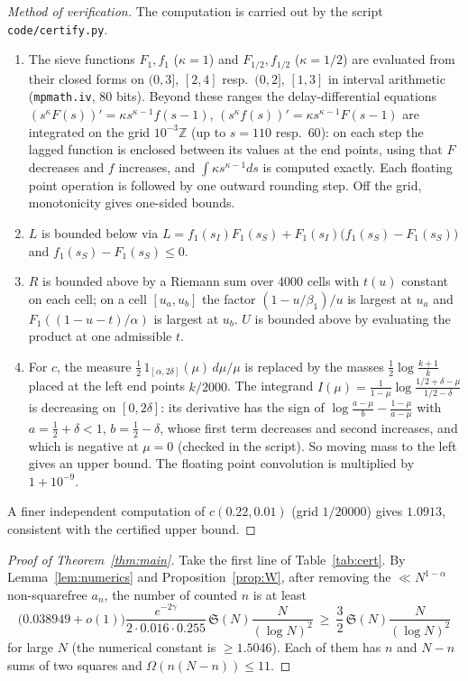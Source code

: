 \documentclass[11pt]{amsart}
\theoremstyle{remark}
\newcommand{\Sg}{\mathfrak{S}}
\begin{document}
\begin{proof}[Method of verification]
The computation is carried out by the script \texttt{code/certify.py}.
\begin{enumerate}
\item The sieve functions $F_1,f_1$ ($\kappa=1$) and $F_{1/2},f_{1/2}$ ($\kappa=1/2$) are evaluated from their
closed forms on $(0,3]$, $[2,4]$ resp.\ $(0,2]$, $[1,3]$ in interval arithmetic (\texttt{mpmath.iv}, 80 bits).
Beyond these ranges the delay-differential equations $(s^\kappa F(s))'=\kappa s^{\kappa-1}f(s-1)$,
$(s^\kappa f(s))'=\kappa s^{\kappa-1}F(s-1)$ are integrated on the grid $10^{-3}\mathbb Z$ (up to $s=110$
resp.\ $60$): on each step the lagged function is enclosed between its values at the end points, using
that $F$ decreases and $f$ increases, and $\int\kappa s^{\kappa-1}ds$ is computed exactly. Each floating
point operation is followed by one outward rounding step. Off the grid, monotonicity gives one-sided bounds.
\item $L$ is bounded below via $L=f_1(s_I)F_1(s_S)+F_1(s_I)\bigl(f_1(s_S)-F_1(s_S)\bigr)$ and
$f_1(s_S)-F_1(s_S)\le0$.
\item $R$ is bounded above by a Riemann sum over $4000$ cells with $t(u)$ constant on each cell; on a cell
$[u_a,u_b]$ the factor $(1-u/\beta_1)/u$ is largest at $u_a$ and $F_1((1-u-t)/\alpha)$ is largest at $u_b$.
$U$ is bounded above by evaluating the product at one admissible $t$.
\item For $c$, the measure $\frac12\,1_{[\alpha,2\delta]}(\mu)\,d\mu/\mu$ is replaced by the masses
$\frac12\log\frac{k+1}{k}$ placed at the left end points $k/2000$. The integrand
$I(\mu)=\frac{1}{1-\mu}\log\frac{1/2+\delta-\mu}{1/2-\delta}$ is decreasing on $[0,2\delta]$: its derivative
has the sign of $\log\frac{a-\mu}{b}-\frac{1-\mu}{a-\mu}$ with $a=\frac12+\delta<1$, $b=\frac12-\delta$, whose
first term decreases and second increases, and which is negative at $\mu=0$ (checked in the script).
So moving mass to the left gives an upper bound. The floating point convolution is multiplied by $1+10^{-9}$.
\end{enumerate}
A finer independent computation of $c(0.22,0.01)$ (grid $1/20000$) gives $1.0913$, consistent with the
certified upper bound.
\end{proof}

\begin{proof}[Proof of Theorem~\ref{thm:main}]
Take the first line of Table~\ref{tab:cert}. By Lemma~\ref{lem:numerics} and Proposition~\ref{prop:W},
after removing the $\ll N^{1-\alpha}$ non-squarefree $a_n$, the number of counted $n$ is at least
\[
\bigl(0.038949+o(1)\bigr)\frac{e^{-2\gamma}}{2\cdot0.016\cdot0.255}\,\Sg(N)\frac{N}{(\log N)^2}
\ \ge\ \frac32\,\Sg(N)\frac{N}{(\log N)^2}
\]
for large $N$ (the numerical constant is $\ge1.5046$). Each of them has $n$ and $N-n$ sums of two squares
and $\Omega(n(N-n))\le 11$.
\end{proof}
\end{document}
